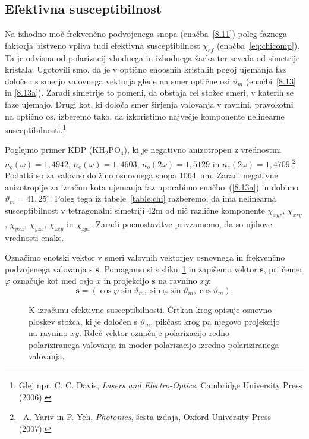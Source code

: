 \subsection*{Efektivna susceptibilnost}
Na izhodno moč frekvenčno podvojenega snopa (enačba~\ref{8.11}) 
poleg faznega faktorja bistveno vpliva tudi efektivna 
susceptibilnost $\chi_{ef}$ (enačba~\ref{eq:chicomp}). Ta je odvisna 
od polarizacij vhodnega in izhodnega žarka ter seveda od simetrije kristala. 
Ugotovili smo, da je v optično enoosnih kristalih pogoj ujemanja faz 
določen s smerjo valovnega vektorja glede na smer optične osi 
$\vartheta_m$ (enačbi~\ref{8.13} in \ref{8.13a}). Zaradi simetrije
to pomeni, da obstaja cel stožec smeri, v katerih se faze ujemajo.
Drugi kot, ki določa smer širjenja valovanja v ravnini, pravokotni na optično os, 
izberemo tako, da izkoristimo največje komponente nelinearne 
susceptibilnosti.\footnote{Glej npr. C. C. Davis, {\it Lasers and Electro-Optics}, 
Cambridge University Press (2006).}

Poglejmo primer KDP (KH$_{2}$PO$_{4}$), ki je negativno anizotropen 
z vrednostmi $n_o(\omega) = 1,4942$, 
$n_e(\omega) = 1,4603$, $n_o(2\omega) = 1,5129$ in $n_e(2\omega) = 
1,4709$.\footnote{~A. Yariv in 
P. Yeh, {\it Photonics}, šesta izdaja, Oxford University Press (2007).}
Podatki so za valovno dolžino osnovnega snopa 1064~nm. 
Zaradi negativne anizotropije za izračun kota ujemanja faz 
uporabimo enačbo~(\ref{8.13a}) in dobimo $\vartheta_m = 41,25^\circ$. 
Poleg tega iz tabele~\ref{table:chi} razberemo, da ima nelinearna susceptibilnost v tetragonalni
simetriji $\bar{4}2$m od nič različne komponente $\chi_{xyz}$, $\chi_{xzy}$, $\chi_{yxz}$,
$\chi_{yzx}$, $\chi_{zxy}$ in $\chi_{zyx}$.
Zaradi poenostavitve privzamemo, da so njihove vrednosti enake. 

Označimo enotski vektor v smeri valovnih vektorjev osnovnega in frekvenčno 
podvojenega valovanja s $\mathbf{s}$. Pomagamo si s sliko~\ref{fig:chi} in zapišemo 
vektor $\mathbf{s}$, pri čemer $\varphi$ označuje kot med osjo $x$ in projekcijo 
$\mathbf{s}$ na ravnino $xy$:
\begin{equation}
\mathbf{s}=(\cos\varphi\sin\vartheta_m,\sin\varphi\sin\vartheta_m,\cos\vartheta_m).
\label{8.14}
\end{equation}

\begin{figure}[ht]
\centering
\def\svgwidth{80truemm} 

\caption{K izračunu efektivne susceptibilnosti. Črtkan krog opisuje osnovno ploskev
stožca, ki je določen s $\vartheta_m$, pikčast krog pa njegovo projekcijo
na ravnino $xy$. Rdeč vektor označuje polarizacijo redno polariziranega valovanja in
moder polarizacijo izredno polariziranega valovanja.}
\label{fig:chi}
\end{figure}


